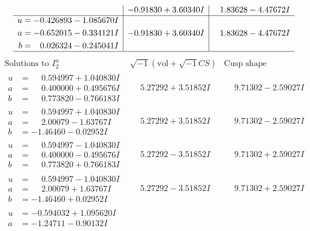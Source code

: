 \documentclass[1p]{elsarticle_modified}
\theoremstyle{definition}
\newcommand{\I}{\sqrt{-1}}
\begin{document}
$$\begin{array}{c|c|c}
 & -0.91830 + 3.60340 I & \phantom{-}1.83628 - 4.47672 I \\ \hline\begin{aligned}
u &= -0.426893 - 1.085670 I \\
a &= -0.652015 - 0.334121 I \\
b &= \phantom{-}0.026324 - 0.245041 I\end{aligned}
 & -0.91830 + 3.60340 I & \phantom{-}1.83628 - 4.47672 I\\
 \hline 
 \end{array}$$\newpage$$\begin{array}{c|c|c}  
\text{Solutions to }I^u_{2}& \I (\text{vol} + \sqrt{-1}CS) & \text{Cusp shape}\\
 \hline 
\begin{aligned}
u &= \phantom{-}0.594997 + 1.040830 I \\
a &= \phantom{-}0.400000 + 0.495676 I \\
b &= \phantom{-}0.773820 - 0.766183 I\end{aligned}
 & \phantom{-}5.27292 + 3.51852 I & \phantom{-}9.71302 - 2.59027 I \\ \hline\begin{aligned}
u &= \phantom{-}0.594997 + 1.040830 I \\
a &= \phantom{-}2.00079 - 1.63767 I \\
b &= -1.46460 - 0.02952 I\end{aligned}
 & \phantom{-}5.27292 + 3.51852 I & \phantom{-}9.71302 - 2.59027 I \\ \hline\begin{aligned}
u &= \phantom{-}0.594997 - 1.040830 I \\
a &= \phantom{-}0.400000 - 0.495676 I \\
b &= \phantom{-}0.773820 + 0.766183 I\end{aligned}
 & \phantom{-}5.27292 - 3.51852 I & \phantom{-}9.71302 + 2.59027 I \\ \hline\begin{aligned}
u &= \phantom{-}0.594997 - 1.040830 I \\
a &= \phantom{-}2.00079 + 1.63767 I \\
b &= -1.46460 + 0.02952 I\end{aligned}
 & \phantom{-}5.27292 - 3.51852 I & \phantom{-}9.71302 + 2.59027 I \\ \hline\begin{aligned}
u &= -0.594032 + 1.095620 I \\
a &= -1.24711 - 0.90132 I \\

\end{aligned}
\end{array}$$
\end{document}
